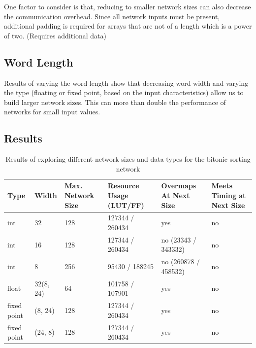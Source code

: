 One factor to consider is that, reducing to smaller network sizes can
also decrease the communication overhead. Since all network inputs
must be present, additional padding is required for arrays that are
not of a length which is a power of two. (Requires additional data)


\subsection{Word Length}

Results of varying the word length show that decreasing word width and
varying the type (floating or fixed point, based on the input
characteristics) allow us to build larger network sizes. This can more
than double the performance of networks for small input values.

\subsection{Results}

\begin{table}[!ht]
  \begin{tabularx}{\textwidth}{X | X | X | X | X | X}
    \hline
    Type & Width & Max. Network Size & Resource Usage (LUT/FF) & Overmaps At Next Size & Meets Timing at Next Size \\
    \hline
    \hline
    int & 32 & 128 & 127344 / 260434 & yes & no \\
    \hline
    int & 16 & 128 & 127344 / 260434 & no (23343 / 343332) & no \\
    \hline
    int & 8 & 256 & 95430 / 188245 & no (260878 / 458532) & no \\
    \hline
    float & 32(8, 24) & 64 & 101758 / 107901 & yes & no \\
    \hline
    fixed point & (8, 24) & 128 & 127344 / 260434 & yes & no \\
    \hline
    fixed point & (24, 8) & 128 & 127344 / 260434 & yes & no \\
  \end{tabularx}
  \caption{Results of exploring different network sizes and data types for the bitonic sorting network}
\end{table}

